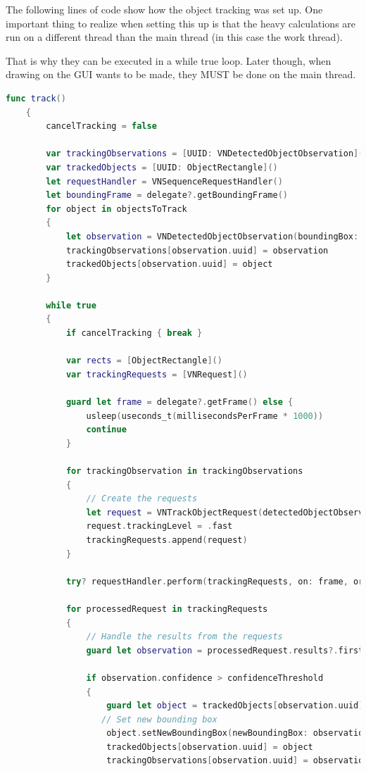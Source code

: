 The following lines of code show how the object tracking was set up. One important thing to realize when setting this up is that the heavy calculations are run on a different thread than the main thread (in this case the work thread). 

That is why they can be executed in a while true loop. Later though, when drawing on the GUI wants to be made, they MUST be done on the main thread.

\begin{lstlisting}[language=swift]
func track()
    {
        cancelTracking = false
        
        var trackingObservations = [UUID: VNDetectedObjectObservation]()
        var trackedObjects = [UUID: ObjectRectangle]()
        let requestHandler = VNSequenceRequestHandler()
        let boundingFrame = delegate?.getBoundingFrame()
        for object in objectsToTrack
        {
            let observation = VNDetectedObjectObservation(boundingBox: object.getNormalizedRect(frame: viewFrame))
            trackingObservations[observation.uuid] = observation
            trackedObjects[observation.uuid] = object
        }
        
        while true
        {
            if cancelTracking { break }
            
            var rects = [ObjectRectangle]()
            var trackingRequests = [VNRequest]()
            
            guard let frame = delegate?.getFrame() else {
                usleep(useconds_t(millisecondsPerFrame * 1000))
                continue
            }
            
            for trackingObservation in trackingObservations
            {
                // Create the requests
                let request = VNTrackObjectRequest(detectedObjectObservation: trackingObservation.value)
                request.trackingLevel = .fast
                trackingRequests.append(request)
            }

            try? requestHandler.perform(trackingRequests, on: frame, orientation: CGImagePropertyOrientation.up)

            for processedRequest in trackingRequests
            {
                // Handle the results from the requests
                guard let observation = processedRequest.results?.first as? VNDetectedObjectObservation else { continue }
                
                if observation.confidence > confidenceThreshold
                {
                    guard let object = trackedObjects[observation.uuid] else { continue }
                   // Set new bounding box
                    object.setNewBoundingBox(newBoundingBox: observation.boundingBox, frame: boundingFrame)
                    trackedObjects[observation.uuid] = object
                    trackingObservations[observation.uuid] = observation
                    

\end{lstlisting}
